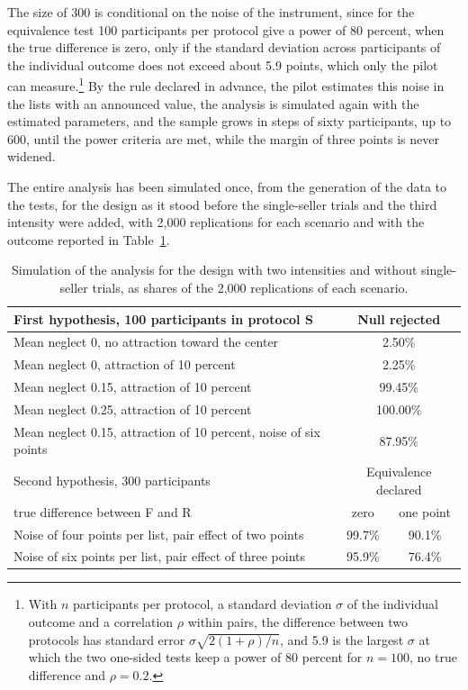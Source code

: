 \documentclass[11pt,a4paper]{article}
\newcommand{\prot}[1]{\textsf{#1}}
\begin{document}
The size of 300 is conditional on the noise of the instrument, since for the equivalence test 100 participants per protocol give a power of 80 percent, when the true difference is zero, only if the standard deviation across participants of the individual outcome does not exceed about 5.9 points, which only the pilot can measure.\footnote{With $n$ participants per protocol, a standard deviation $\sigma$ of the individual outcome and a correlation $\rho$ within pairs, the difference between two protocols has standard error $\sigma\sqrt{2(1+\rho)/n}$, and 5.9 is the largest $\sigma$ at which the two one-sided tests keep a power of 80 percent for $n=100$, no true difference and $\rho=0.2$.} By the rule declared in advance, the pilot estimates this noise in the lists with an announced value, the analysis is simulated again with the estimated parameters, and the sample grows in steps of sixty participants, up to 600, until the power criteria are met, while the margin of three points is never widened.

The entire analysis has been simulated once, from the generation of the data to the tests, for the design as it stood before the single-seller trials and the third intensity were added, with 2,000 replications for each scenario and with the outcome reported in Table~\ref{tab:simulation}.

\begin{table}[H]
\centering
\small
\begin{tabular*}{0.94\linewidth}{@{\extracolsep{\fill}}lcc@{}}
\toprule
First hypothesis, 100 participants in protocol \prot{S} & \multicolumn{2}{c}{Null rejected}\\
\midrule
Mean neglect 0, no attraction toward the center & \multicolumn{2}{c}{2.50\%}\\
Mean neglect 0, attraction of 10 percent & \multicolumn{2}{c}{2.25\%}\\
Mean neglect 0.15, attraction of 10 percent & \multicolumn{2}{c}{99.45\%}\\
Mean neglect 0.25, attraction of 10 percent & \multicolumn{2}{c}{100.00\%}\\
Mean neglect 0.15, attraction of 10 percent, noise of six points & \multicolumn{2}{c}{87.95\%}\\
\midrule
Second hypothesis, 300 participants & \multicolumn{2}{c}{Equivalence declared}\\
\quad true difference between \prot{F} and \prot{R} & zero & one point\\
\midrule
Noise of four points per list, pair effect of two points & 99.7\% & 90.1\%\\
Noise of six points per list, pair effect of three points & 95.9\% & 76.4\%\\
\bottomrule
\end{tabular*}
\caption{Simulation of the analysis for the design with two intensities and without single-seller trials, as shares of the 2,000 replications of each scenario.}
\label{tab:simulation}
\end{table}
\end{document}
